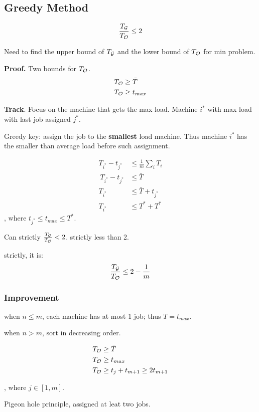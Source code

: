 \documentclass[a4paper]{report}
\theoremstyle{definition}
\begin{document}
\subsection{Greedy Method}
$$
\frac{T_{\mathcal{G}}}{T_{\mathcal{O}}} \leq 2
$$

Need to find the upper bound of $T_{\mathcal{G}}$ and the lower bound of $T_{\mathcal{O}}$ for min problem.

\textbf{Proof.} Two bounds for $T_{\mathcal{O}}$.
\begin{align*}
T_{\mathcal{O}} &\geq \bar T \\
T_{\mathcal{O}} &\geq t_{max}
\end{align*}

\textbf{Track}. Focus on the machine that gets the max load. Machine $i^*$ with max load with last job assigned $j^*$.

Greedy key: assign the job to the \textbf{smallest} load machine. Thus machine $i^*$ has the smaller than average load before such assignment.

\begin{align*}
T_{i^*} - t_{j^*} &\leq \frac{1}{m} \sum_{i} T_i\\\
T_{i^*} - t_{j^*} &\leq \bar T \\
T_{i^*} &\leq \bar T + t_{j^*}\\
T_{i^*} &\leq T^* +T^*
\end{align*}
, where $t_{j^*}\leq t_{max}\leq T^*$.

Can strictly $\frac{T_{\mathcal{G}}}{T_{\mathcal{O}}}<2$. strictly less than 2.

strictly, it is:
$$
\frac{T_{\mathcal{G}}}{T_{\mathcal{O}}} \leq 2-\frac{1}{m}
$$

\subsubsection{Improvement}
when $n\leq m$, each machine has at most 1 job; thus $T=t_{max}$.

when $n>m$, sort in decreasing order.

\begin{align*}
& T_{\mathcal{O}} \geq \bar T \\
& T_{\mathcal{O}} \geq t_{max} \\
& T_{\mathcal{O}} \geq t_j + t_{m+1} \geq 2t_{m+1} \\
\end{align*}

, where $j\in[1, m]$.

Pigeon hole principle, assigned at leat two jobs.
\end{document}
